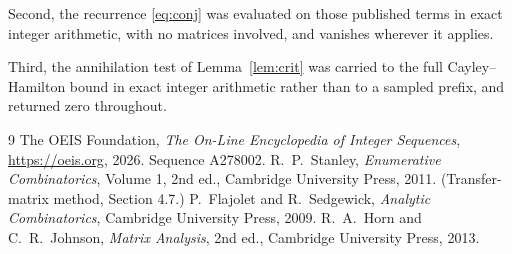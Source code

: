 \documentclass[11pt,a4paper]{article}
\theoremstyle{plain}
\theoremstyle{definition}
\begin{document}
Second, the recurrence \eqref{eq:conj} was evaluated on those published terms in exact
integer arithmetic, with no matrices involved, and vanishes wherever it applies.

Third, the annihilation test of Lemma~\ref{lem:crit} was carried to the full
Cayley--Hamilton bound in exact integer arithmetic rather than to a sampled prefix, and
returned zero throughout.

\begin{thebibliography}{9}
 The OEIS Foundation, \emph{The On-Line Encyclopedia of Integer
Sequences}, \url{https://oeis.org}, 2026. Sequence A278002.
 R.~P.~Stanley, \emph{Enumerative Combinatorics}, Volume 1, 2nd ed.,
Cambridge University Press, 2011. (Transfer-matrix method, Section 4.7.)
 P.~Flajolet and R.~Sedgewick, \emph{Analytic Combinatorics}, Cambridge
University Press, 2009.
 R.~A.~Horn and C.~R.~Johnson, \emph{Matrix Analysis}, 2nd ed., Cambridge
University Press, 2013.
\end{thebibliography}
\end{document}
